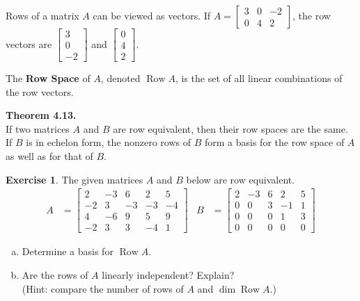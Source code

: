 \documentclass[10pt]{book}
\newcommand{\boxcolor}{gray!30}
\newenvironment{boxthm}{\begin{mdframed}[backgroundcolor=\boxcolor,nobreak=true]}{\end{mdframed}}
\newenvironment{boxdef}{\begin{mdframed}[backgroundcolor=\boxcolor,linewidth=0pt,nobreak=true]}{\end{mdframed}}
\theoremstyle{definition}
\newtheorem{exercise}{Exercise}[section]
\DeclareMathOperator{\Row}{Row}
\begin{document}
\begin{boxdef}
	Rows of a matrix $A$ can be viewed as vectors. If $A=\begin{bmatrix}3&0&-2\\0&4&2\end{bmatrix}$, the row vectors are $\begin{bmatrix}3\\0\\-2\end{bmatrix}$ and $\begin{bmatrix}0\\4\\2\end{bmatrix}$.
	
	The \textbf{Row Space} of $A$, denoted $\Row A$, is the set of all linear combinations of the row vectors.
\end{boxdef}
\vspace{-1em}
\begin{boxthm}
	\textbf{Theorem 4.13.} \\
	If two matrices $A$ and $B$ are row equivalent, then their row spaces are the same. If $B$ is in echelon form, the nonzero rows of $B$ form a basis for the row space of $A$ as well as for that of $B$.
\end{boxthm}

\begin{exercise} %
	The given matrices $A$ and $B$ below are row equivalent.
	\begin{align*}
	A &= \begin{bmatrix}2&-3&6&2&5\\-2&3&-3&-3&-4\\4&-6&9&5&9\\-2&3&3&-4&1\end{bmatrix} &
	B &= \begin{bmatrix}2&-3&6&2&5\\0&0&3&-1&1\\0&0&0&1&3\\0&0&0&0&0\end{bmatrix}
	\end{align*}
	\begin{enumerate}[(a)]
		\item Determine a basis for $\Row A$.
		\vfill
		\item Are the rows of $A$ linearly independent? Explain? \\
		(Hint: compare the number of rows of $A$ and $\dim\Row A$.)
		\vspace{.5in}
	\end{enumerate}
\end{exercise}
\end{document}
